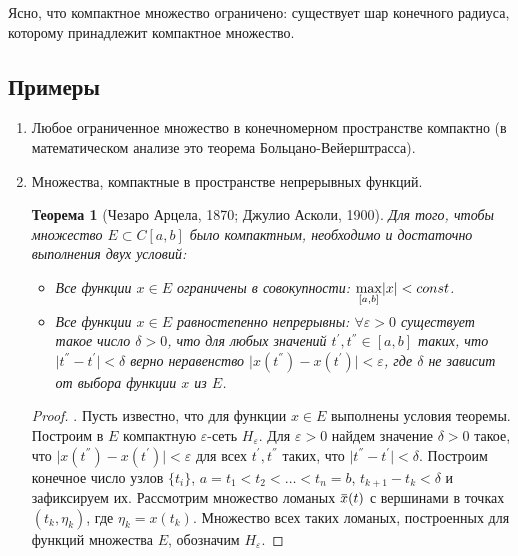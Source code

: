 \documentclass[12pt,a4paper,titlepage,oneside]{book}
\newcommand{\overbar}[1]{\mkern 1.5mu\overline{\mkern-1.5mu#1\mkern-1.5mu}\mkern 1.5mu}
\theoremstyle{definition}
\theoremstyle{plain}
\newtheorem*{theorem}{Теорема}
\theoremstyle{break}
\theoremstyle{remark}
\theoremstyle{remark}
\theoremstyle{remark}
\theoremstyle{remark}
\theoremstyle{plain}
\theoremstyle{plain}
\begin{document}
Ясно, что компактное множество ограничено: существует шар конечного радиуса, которому принадлежит компактное множество.

\subsection*{Примеры}
\begin{enumerate}

	\item Любое ограниченное множество в конечномерном пространстве компактно (в математическом анализе это теорема Больцано-Вейерштрасса).

	\item Множества, компактные в пространстве непрерывных функций.

\begin{theorem}[Чезаро Арцела, 1870; Джулио Асколи, 1900]
Для того, чтобы множество $E \subset C[a, b]$ было компактным, необходимо и достаточно выполнения двух условий:

\begin{itemize}

	\item  Все функции $x\in E$ ограничены в совокупности: $\smash{\displaystyle\max_{ [a,b]}}  \vert x \vert  < const$.

	\item  Все функции $x\in E$ равностепенно непрерывны: $\forall \varepsilon>0$ существует такое число $\delta>0$, что для любых значений $t^{'}, t^{''} \in [a, b]$ таких, что $ \vert t^{''}-t^{'} \vert  <\delta$ верно неравенство $ \vert x(t^{''})-x(t^{'}) \vert  <\varepsilon$, где $\delta$ не зависит от выбора функции $x$ из $E$.
	
\end{itemize}

\end{theorem}
\begin{proof} 
	. Пусть известно, что для функции $x\in E$ выполнены условия теоремы. Построим в $E$ компактную 	$\varepsilon$-сеть $H_{\varepsilon}$. Для 	$ \varepsilon>0$ найдем значение $\delta>0$ такое, что $ \vert x(t^{''})-x(t^{'}) \vert  <\varepsilon$ для всех $t^{'}, t^{''}$ таких, что $ \vert t^{''}-t^{'} \vert  <\delta$. Построим конечное число узлов $\{t_i\}$, $a=t_1<t_2<\ldots<t_n=b$, $t_{k+1}-t_k< \delta$ и зафиксируем их. Рассмотрим множество ломаных $\overbar{x}(t)$ с вершинами в точках $(t_k, \eta_k )$, где $\eta_k=x(t_k)$. Множество всех таких ломаных, построенных для функций множества $E$, обозначим $H_{\varepsilon}$.
	

\end{proof}
\end{enumerate}
\end{document}
